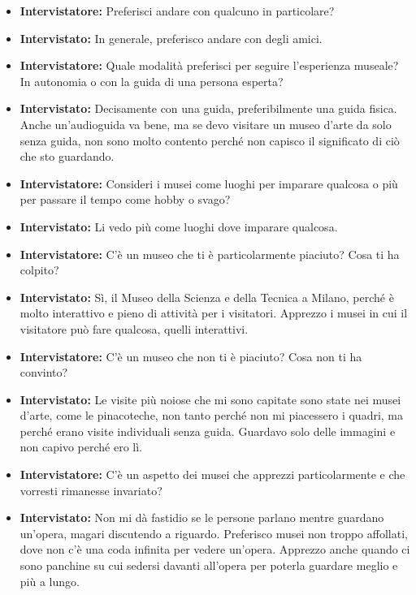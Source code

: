 \documentclass{article}
\begin{document}
\begin{itemize}
    \item \textbf{Intervistatore:} Preferisci andare con qualcuno in particolare?

    \item \textbf{Intervistato:} In generale, preferisco andare con degli amici.

    \item \textbf{Intervistatore:} Quale modalità preferisci per seguire l’esperienza museale? In autonomia o con la guida di una persona esperta?

    \item \textbf{Intervistato:} Decisamente con una guida, preferibilmente una guida fisica. Anche un’audioguida va bene, ma se devo visitare un museo d’arte da solo senza guida, non sono molto contento perché non capisco il significato di ciò che sto guardando.

    \item \textbf{Intervistatore:} Consideri i musei come luoghi per imparare qualcosa o più per passare il tempo come hobby o svago?

    \item \textbf{Intervistato:} Li vedo più come luoghi dove imparare qualcosa.

    \item \textbf{Intervistatore:} C’è un museo che ti è particolarmente piaciuto? Cosa ti ha colpito?

    \item \textbf{Intervistato:} Sì, il Museo della Scienza e della Tecnica a Milano, perché è molto interattivo e pieno di attività per i visitatori. Apprezzo i musei in cui il visitatore può fare qualcosa, quelli interattivi.

    \item \textbf{Intervistatore:} C’è un museo che non ti è piaciuto? Cosa non ti ha convinto?

    \item \textbf{Intervistato:} Le visite più noiose che mi sono capitate sono state nei musei d’arte, come le pinacoteche, non tanto perché non mi piacessero i quadri, ma perché erano visite individuali senza guida. Guardavo solo delle immagini e non capivo perché ero lì.

    \item \textbf{Intervistatore:} C’è un aspetto dei musei che apprezzi particolarmente e che vorresti rimanesse invariato?

    \item \textbf{Intervistato:} Non mi dà fastidio se le persone parlano mentre guardano un’opera, magari discutendo a riguardo. Preferisco musei non troppo affollati, dove non c’è una coda infinita per vedere un’opera. Apprezzo anche quando ci sono panchine su cui sedersi davanti all’opera per poterla guardare meglio e più a lungo.


\end{itemize}
\end{document}
